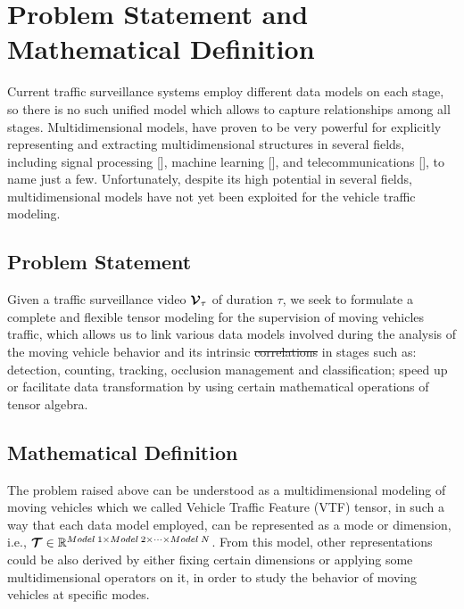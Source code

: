 \documentclass[sensors,article,submit,moreauthors,pdftex]{Definitions/mdpi}
\newcommand{\mathten}[1]{\boldsymbol{\mathbf{\mathcal{\MakeUppercase{#1}}}}}
\providecommand{\DIFadd}[1]{{\protect\color{blue}\uwave{#1}}} %
\providecommand{\DIFdel}[1]{{\protect\color{red}\sout{#1}}}                      %
\providecommand{\DIFaddbegin}{} %
\providecommand{\DIFaddend}{} %
\providecommand{\DIFdelbegin}{} %
\providecommand{\DIFdelend}{} %
\begin{document}
\section{Problem Statement and Mathematical Definition}

Current traffic surveillance systems employ different data models on each stage, so there is no such unified model which allows to capture relationships among all stages. Multidimensional models, have proven to be very powerful for explicitly representing and extracting multidimensional structures in several fields, including signal processing [], machine learning [],  and telecommunications [], to name just a few. Unfortunately, despite its high potential in several fields, multidimensional models have not yet been exploited for the vehicle traffic modeling.



\subsection{Problem Statement}
Given a traffic surveillance video $\mathten{V}_\tau$ of duration $\tau$, we seek to formulate a complete and flexible tensor modeling for the supervision of moving vehicles traffic, which allows us to link various data models involved during the analysis of the moving vehicle behavior and its intrinsic \DIFdelbegin \DIFdel{correlations }\DIFdelend \DIFaddbegin \DIFadd{relations }\DIFaddend in stages such as: detection, counting, tracking, occlusion management and classification; speed up or facilitate data transformation by using certain mathematical operations of tensor algebra.



\subsection{Mathematical Definition}
The problem raised above can be understood as a multidimensional modeling of moving vehicles which we called Vehicle Traffic Feature (VTF) tensor, in such a way that each data model employed, can be represented as a mode or dimension, i.e., $\mathten{T} \in \mathbb{R}^{Model\:1 \times Model\:2 \times \cdots \times Model\:N}$. From this model, other representations could be also derived by either fixing certain dimensions or applying some multidimensional operators on it, in order to study the behavior of moving vehicles at specific modes.


\end{document}
